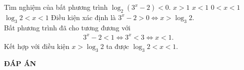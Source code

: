 \begin{ex}%
 Tìm nghiệm của bất phương trình $\log_2 (3^x - 2) < 0$.
 \choice
  {$x > 1$}
  {$x < 1$}
  {$0 < x < 1$}
  {\True $\log_3 2 < x < 1$}
 \loigiai
  {
  Điều kiện xác định là $3^x - 2 > 0 \Leftrightarrow x > \log_3 2$.\\
  Bất phương trình đã cho tương đương với
  \begin{eqnarray*}
   3^x - 2 < 1 \Leftrightarrow 3^x < 3 \Leftrightarrow x < 1.
  \end{eqnarray*}
  Kết hợp với điều kiện $x > \log_3 2 $ ta được $\log_3 2 < x < 1$.
  }
\end{ex}



\newpage
\begin{center}
	\textbf{ĐÁP ÁN}
\end{center}
\begin{multicols}{10}
	 
\end{multicols}

